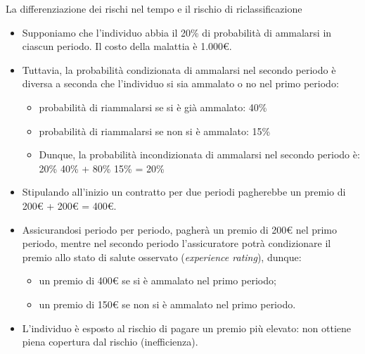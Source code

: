 \documentclass[aspectratio=64,12pt]{beamer}
\begin{document}
\begin{frame}{La differenziazione dei rischi nel tempo e il rischio di riclassificazione}
\begin{resize}{0.9}
\begin{itemize}
\item Supponiamo che l'individuo abbia il 20\% di probabilità di ammalarsi in
ciascun periodo. Il costo della malattia è 1.000€.
\item Tuttavia, la probabilità \alert{condizionata} di ammalarsi nel secondo periodo è
diversa a seconda che l'individuo si sia ammalato o no nel primo periodo:
\begin{itemize}
\item probabilità di riammalarsi se si è già ammalato: 40\%
\item probabilità di riammalarsi se non si è ammalato: 15\%
\item Dunque, la probabilità incondizionata di ammalarsi nel secondo periodo è:\\[0pt]
20\% \texttimes{} 40\% + 80\% \texttimes{} 15\% = 20\%
\end{itemize}
\item Stipulando all'inizio un contratto per due periodi pagherebbe un premio di
200€ + 200€ = 400€.
\item Assicurandosi periodo per periodo, pagherà un premio di 200€ nel primo
periodo, mentre nel secondo periodo l'assicuratore potrà condizionare il
premio allo stato di salute osservato (\emph{experience rating}), dunque:
\begin{itemize}
\item un premio di 400€ se si è ammalato nel primo periodo;
\item un premio di 150€ se non si è ammalato nel primo periodo.
\end{itemize}
\item L'individuo è esposto al rischio di pagare un premio più elevato: non
  ottiene piena copertura dal rischio (inefficienza).
\end{itemize}
\end{resize}
\end{frame}
\end{document}
